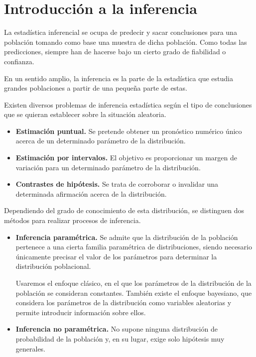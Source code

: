\chapter{Introducción a la inferencia}

La estadística inferencial se ocupa de predecir y sacar conclusiones para una población tomando como base una muestra de dicha población.
Como todas las predicciones, siempre han de hacerse bajo un cierto grado de fiabilidad o confianza.

En un sentido amplio, la inferencia es la parte de la estadística que estudia grandes poblaciones a partir de una pequeña parte de estas.

Existen diversos problemas de inferencia estadística según el tipo de conclusiones que se quieran establecer sobre la situación aleatoria.
\begin{itemize}
    \item \textbf{Estimación puntual.}
          Se pretende obtener un pronóstico numérico único acerca de un determinado parámetro de la distribución.
    \item \textbf{Estimación por intervalos.}
          El objetivo es proporcionar un margen de variación para un determinado parámetro de la distribución.
    \item \textbf{Contrastes de hipótesis.}
          Se trata de corroborar o invalidar una determinada afirmación acerca de la distribución.
\end{itemize}

Dependiendo del grado de conocimiento de esta distribución, se distinguen dos métodos para realizar procesos de inferencia.
\begin{itemize}
    \item \textbf{Inferencia paramétrica.}
          Se admite que la distribución de la población pertenece a una cierta familia paramétrica de distribuciones, siendo necesario únicamente precisar el valor de los parámetros para determinar la distribución poblacional.

          Usaremos el enfoque clásico, en el que los parámetros de la distribución de la población se consideran constantes.
          También existe el enfoque bayesiano, que considera los parámetros de la distribución como variables aleatorias y permite introducir información sobre ellos.

    \item \textbf{Inferencia no paramétrica.}
          No supone ninguna distribución de probabilidad de la población y, en su lugar, exige solo hipótesis muy generales.
\end{itemize}

